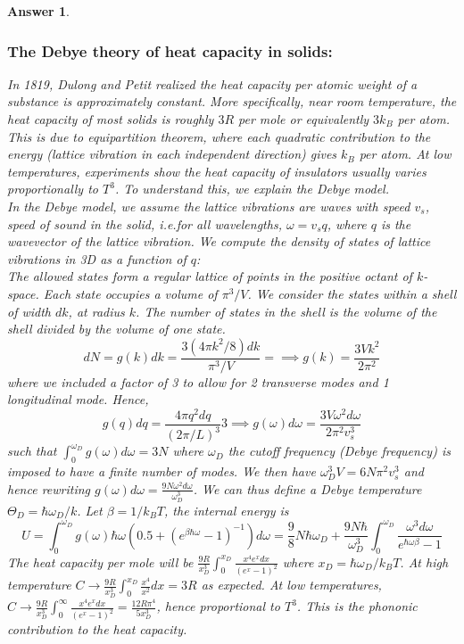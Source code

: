 \documentclass[a4paper]{article}
\newtheorem{ans}{Answer}[subsection]
\theoremstyle{new}
\begin{document}
\begin{ans}\leavevmode
\subsubsection*{The Debye theory of heat capacity in solids:}
In 1819, Dulong and Petit realized the heat capacity per atomic weight of a substance is approximately constant. More specifically, near room temperature, the heat capacity of most solids is roughly $3R$ per mole or equivalently $3k_B$ per atom. This is due to equipartition theorem, where each quadratic contribution to the energy (lattice vibration in each independent direction) gives $k_B$ per atom. At low temperatures, experiments show the heat capacity of insulators usually varies proportionally to $T^3$. To understand this, we explain the Debye model.\\[5pt]
In the Debye model, we assume the lattice vibrations are waves with speed $v_s$, speed of sound in the solid, i.e.for all wavelengths, $\omega=v_sq$, where $q$ is the wavevector of the lattice vibration. We compute the density of states of lattice vibrations in 3D as a function of $q$:\\[5pt]
The allowed states form a regular lattice of points in the positive octant of $k$-space. Each state occupies a volume of $\pi^3/V$. We consider the states within a shell of width $dk$, at radius $k$. The number of states in the shell is the volume of the shell divided by the volume of one state.
$$dN=g(k)dk=\frac{3(4\pi k^2/8)dk}{\pi^3/V}=\implies g(k)=\frac{3Vk^2}{2\pi^2}$$
where we included a factor of 3 to allow for 2 transverse modes and 1 longitudinal mode. Hence,
$$g(q)dq=\frac{4\pi q^2dq}{(2\pi/L)^3}3\implies g(\omega)d\omega=\frac{3V\omega^2d\omega}{2\pi^2v_s^3}$$
such that $\int_0^{\omega_D}g(\omega)d\omega=3N$ where $\omega_D$ the cutoff frequency (Debye frequency) is imposed to have a finite number of modes. We then have $\omega_D^3V=6N\pi^2v_s^3$ and hence rewriting $g(\omega)d\omega=\frac{9N\omega^2d\omega}{\omega_D^3}$. We can thus define a Debye temperature $\Theta_D=\hbar\omega_D/k$. Let $\beta=1/k_BT$, the internal energy is 
$$U=\int_0^{\omega_D}g(\omega)\hbar\omega(0.5+(e^{\beta\hbar\omega}-1)^{-1})d\omega=\frac{9}{8}N\hbar\omega_D+\frac{9N\hbar}{\omega_D^3}\int_0^{\omega_D}\frac{\omega^3d\omega}{e^{\hbar\omega\beta}-1}$$
The heat capacity per mole will be $\frac{9R}{x_D^3}\int_0^{x_D}\frac{x^4e^xdx}{(e^x-1)^2}$ where $x_D=\hbar\omega_D/k_BT$. At high temperature $C\rightarrow\frac{9R}{x_D^3}\int_0^{x_D}\frac{x^4}{x^2}dx=3R$ as expected. At low temperatures, $C\rightarrow\frac{9R}{x_D^3}\int_0^\infty\frac{x^4e^xdx}{(e^x-1)^2}=\frac{12R\pi^4}{5x_D^3}$, hence proportional to $T^3$. This is the phononic contribution to the heat capacity.\\[5pt]

\end{ans}
\end{document}
